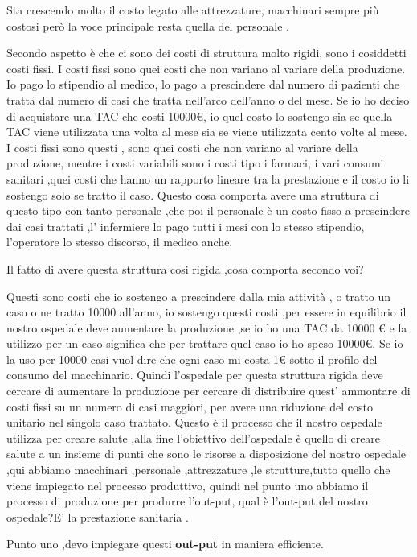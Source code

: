 Sta crescendo molto il costo legato alle attrezzature, macchinari sempre
più costosi però la voce principale resta quella del personale .

Secondo aspetto è che ci sono dei costi di struttura molto rigidi, sono
i cosiddetti costi fissi. I costi fissi sono quei costi che non variano
al variare della produzione. Io pago lo stipendio al medico, lo pago a
prescindere dal numero di pazienti che tratta dal numero di casi che
tratta nell'arco dell'anno o del mese. Se io ho deciso di acquistare una
TAC che costi 10000\euro{}, io quel costo lo sostengo sia se quella TAC
viene utilizzata una volta al mese sia se viene utilizzata cento volte
al mese. I costi fissi sono questi , sono quei costi che non variano al
variare della produzione, mentre i costi variabili sono i costi tipo i
farmaci, i vari consumi sanitari ,quei costi che hanno un rapporto
lineare tra la prestazione e il costo io li sostengo solo se tratto il
caso. Questo cosa comporta avere una struttura di questo tipo con tanto
personale ,che poi il personale è un costo fisso a prescindere dai casi
trattati ,l' infermiere lo pago tutti i mesi con lo stesso stipendio,
l'operatore lo stesso discorso, il medico anche.

Il fatto di avere questa struttura cosi rigida ,cosa comporta secondo
voi?

Questi sono costi che io sostengo a prescindere dalla mia attività , o
tratto un caso o ne tratto 10000 all'anno, io sostengo questi costi ,per
essere in equilibrio il nostro ospedale deve aumentare la produzione ,se
io ho una TAC da 10000 \euro{} e la utilizzo per un caso significa che
per trattare quel caso io ho speso 10000\euro{}. Se io la uso per 10000
casi vuol dire che ogni caso mi costa 1\euro{} sotto il profilo del
consumo del macchinario. Quindi l'ospedale per questa struttura rigida
deve cercare di aumentare la produzione per cercare di distribuire
quest' ammontare di costi fissi su un numero di casi maggiori, per avere
una riduzione del costo unitario nel singolo caso trattato. Questo è il
processo che il nostro ospedale utilizza per creare salute ,alla fine
l'obiettivo dell'ospedale è quello di creare salute a un insieme di
punti che sono le risorse a disposizione del nostro ospedale ,qui
abbiamo macchinari ,personale ,attrezzature ,le strutture,tutto quello
che viene impiegato nel processo produttivo, quindi nel punto uno
abbiamo il processo di produzione per produrre l'out-put, qual è
l'out-put del nostro ospedale?E' la prestazione sanitaria .

Punto uno ,devo impiegare questi \textbf{out-put} in maniera efficiente.

